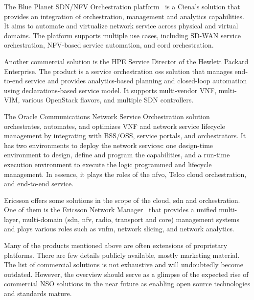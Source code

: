 The Blue Planet SDN/NFV Orchestration platform~\cite{BluePlanet2017BLUESUITE} is a Ciena's solution that provides an integration of orchestration, management and analytics capabilities. It aims to automate and virtualize network service across physical and virtual domains. The platform supports multiple use cases, including SD-WAN service orchestration, NFV-based service automation, and \gls{cord} orchestration.

Another commercial solution is the HPE Service Director of the Hewlett Packard Enterprise. The product is a service orchestration \gls{oss} solution that manages end-to-end service and provides analytics-based planning and closed-loop automation using declarations-based service model. It supports multi-vendor VNF, multi-VIM, various OpenStack flavors, and multiple SDN controllers.

The Oracle Communications Network Service Orchestration solution~\cite{OracleCommunicationsOracleSolution} orchestrates, automates, and optimizes VNF and network service lifecycle management by integrating with BSS/OSS, service portals, and orchestrators. It has two environments to deploy the network services: one design-time environment to design, define and program the capabilities, and a run-time execution environment to execute the logic programmed and lifecycle management. In essence, it plays the roles of the \gls{nfvo}, Telco cloud orchestration, and end-to-end service.  

Ericsson offers some solutions in the scope of the cloud, \gls{sdn} and orchestration. One of them is the Ericsson Network Manager~\cite{EricssonInc.EricssonManager} that provides a unified multi-layer, multi-domain (\gls{sdn}, \gls{nfv}, radio, transport and core) management systems and plays various roles such as \gls{vnfm}, network slicing, and network analytics. 

Many of the products mentioned above are often extensions of proprietary platforms. There are few details publicly available, mostly marketing material. The list of commercial solutions is not exhaustive and will undoubtedly become outdated. However, the overview should serve as a glimpse of the expected rise of commercial NSO solutions in the near future as enabling open source technologies and standards mature.

